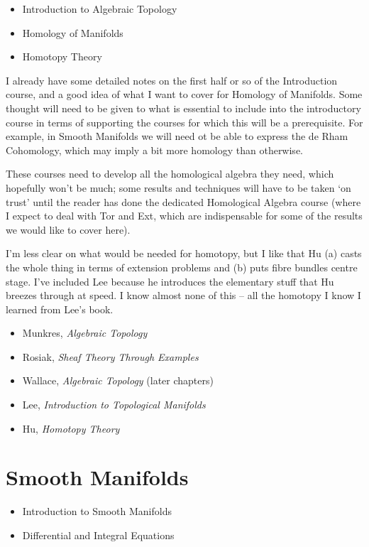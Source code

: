 \documentclass[article]{article}
\begin{document}
\begin{itemize}
	\item{Introduction to Algebraic Topology}
	\item{Homology of Manifolds}
	\item{Homotopy Theory}
\end{itemize}

I already have some detailed notes on the first half or so of the Introduction course, and a good idea of what I want to cover for Homology of Manifolds. Some thought will need to be given to what is essential to include into the introductory course in terms of supporting the courses for which this will be a prerequisite. For example, in Smooth Manifolds we will need ot be able to express the de Rham Cohomology, which may imply a bit more homology than otherwise.

These courses need to develop all the homological algebra they need, which hopefully won't be much; some results and techniques will have to be taken `on trust' until the reader has done the dedicated Homological Algebra course (where I expect to deal with Tor and Ext, which are indispensable for some of the results we would like to cover here).

I'm less clear on what would be needed for homotopy, but I like that Hu (a) casts the whole thing in terms of extension problems and (b) puts fibre bundles centre stage. I've included Lee because he introduces the elementary stuff that Hu breezes through at speed. I know almost none of this -- all the homotopy I know I learned from Lee's book.

\begin{itemize}
	\item[]{Munkres, \textit{Algebraic Topology}}
	\item[]{Rosiak, \textit{Sheaf Theory Through Examples}}
	\item[]{Wallace, \textit{Algebraic Topology} (later chapters)}
	\item[]{Lee, \textit{Introduction to Topological Manifolds}}
	\item[]{Hu, \textit{Homotopy Theory}}
\end{itemize}

\section{Smooth Manifolds}

\begin{itemize}
	\item{Introduction to Smooth Manifolds}
	\item{Differential and Integral Equations}
\end{itemize}
\end{document}
